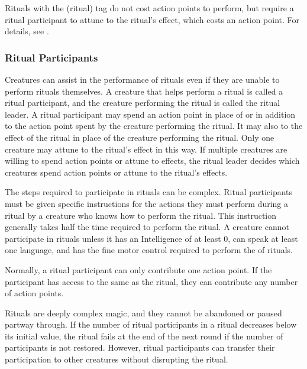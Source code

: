         Rituals with the  (ritual) tag do not cost action points to perform, but require a ritual participant to attune to the ritual's effect, which costs an action point.
        For details, see .

        \subsubsection{Ritual Participants}
            Creatures can assist in the performance of rituals even if they are unable to perform rituals themselves.
            A creature that helps perform a ritual is called a ritual participant, and the creature performing the ritual is called the ritual leader.
            A ritual participant may spend an action point in place of or in addition to the action point spent by the creature performing the ritual.
            It may also  to the effect of the ritual in place of the creature performing the ritual.
            Only one creature may attune to the ritual's effect in this way.
            If multiple creatures are willing to spend action points or attune to effects, the ritual leader decides which creatures spend action points or attune to the ritual's effects.

            The steps required to participate in rituals can be complex.
            Ritual participants must be given specific instructions for the actions they must perform during a ritual by a creature who knows how to perform the ritual.
            This instruction generally takes half the time required to perform the ritual.
            A creature cannot participate in rituals unless it has an Intelligence of at least 0, can speak at least one language, and has the fine motor control required to perform the  of rituals.

            Normally, a ritual participant can only contribute one action point.
            If the participant has access to the same  as the ritual, they can contribute any number of action points.

            Rituals are deeply complex magic, and they cannot be abandoned or paused partway through.
            If the number of ritual participants in a ritual decreases below its initial value, the ritual fails at the end of the next round if the number of participants is not restored.
            However, ritual participants can transfer their participation to other creatures without disrupting the ritual.

